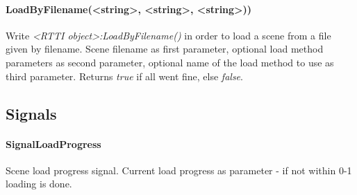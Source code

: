 \paragraph{LoadByFilename(<string>, <string>, <string>))}
Write \emph{<RTTI object>:LoadByFilename()} in order to load a scene from a file given by filename. Scene filename as first parameter, optional load method parameters as second parameter, optional name of the load method to use as third parameter. Returns \emph{true} if all went fine, else \emph{false}.


\subsection{Signals}

\paragraph{SignalLoadProgress}
Scene load progress signal. Current load progress as parameter - if not within 0-1 loading is done.
